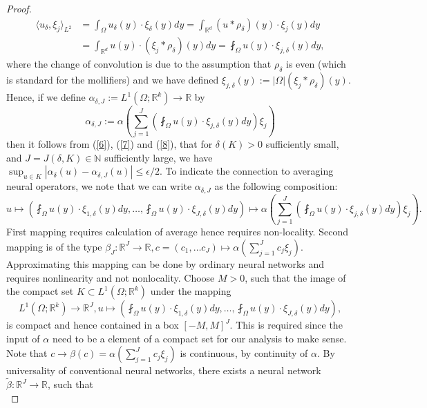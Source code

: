 \documentclass[reqno,9pt]{amsart}
\theoremstyle{plain}
\theoremstyle{definition}
\newcommand{\bb}[1]{\mathbb{#1}}
\begin{document}
\begin{proof}
    \begin{equation} \label{8}
        \begin{aligned}
        \langle u_\delta,\xi_j\rangle_{L^2} &= \int_{\Omega}u_\delta (y) \cdot \xi_\delta (y) dy = \int_{\bb R^d} (u * \rho_\delta)(y) \cdot \xi_j(y) dy \\
        &= \int_{\bb R^d} u(y) \cdot (\xi_j * \rho_\delta)(y) dy = \fint_\Omega u(y) \cdot \xi_{j,\delta}(y) dy,
    \end{aligned}
    \end{equation}
    where the change of convolution is due to the assumption that $\rho_\delta$ is even (which is standard for the mollifiers) and we have defined $\xi_{j,\delta}(y) := |\Omega|(\xi_j * \rho_\delta)(y).$ Hence, if we define $\alpha_{\delta,J}:= L^1(\Omega;\bb R^k) \to \bb R$ by 
    $$ \alpha_{\delta,J} := \alpha\left(\sum_{j=1}^J\left(\fint_\Omega u(y)\cdot \xi_{j,\delta}(y) dy\right)\xi_j\right)$$
    then it follows from (\ref{6}), (\ref{7}) and (\ref{8}), that for $\delta(K) > 0$ sufficiently small, and $J = J(\delta,K) \in \bb N$ sufficiently large, we have $\sup_{u \in K}|\alpha_\delta(u) - \alpha_{\delta, J}(u)| \leq \epsilon/2$. To indicate the connection to averaging neural operators, we note that we can write $\alpha_{\delta, J}$ as the following composition:
    {\small $$ u \mapsto \left(\fint_{\Omega} u(y) \cdot \xi_{1,\delta}(y)dy, \dots, \fint_{\Omega} u(y) \cdot \xi_{J,\delta}(y)dy \right) \mapsto \alpha\left(\sum_{j=1}^J\left(\fint_\Omega u(y)\cdot \xi_{j,\delta}(y) dy\right)\xi_j\right).$$ }
    First mapping requires calculation of average hence requires non-locality. Second mapping is of the type $\beta_J : \bb R^J \to \bb R, c = (c_1, \dots c_J) \mapsto \alpha(\sum_{j=1}^{J}c_j\xi_j).$ Approximating this mapping can be done by ordinary neural networks and requires nonlinearity and not nonlocality. Choose $M > 0$, such that the image of the compact set $K \subset L^1(\Omega;\bb R^k)$ under the mapping
    $$ L^1(\Omega; \bb R^k) \to \bb R^J, u \mapsto \left(\fint_\Omega u(y) \cdot \xi_{1,\delta}(y) dy, \dots, \fint_\Omega u(y) \cdot \xi_{J,\delta}(y) dy\right),$$
    is compact and hence contained in a box $[-M,M]^J$. This is required since the input of $\alpha$ need to be a element of a compact set for our analysis to make sense. Note that $c \to \beta(c) = \alpha\left(\sum_{j=1}^{J}c_j\xi_j\right)$ is continuous, by continuity of $\alpha$. By universality of conventional neural networks, there exists a neural network $\tilde{\beta}: \bb R^J \to \bb R$, such that
    \begin{equation}\label{eq8}

\end{equation}
\end{proof}
\end{document}
